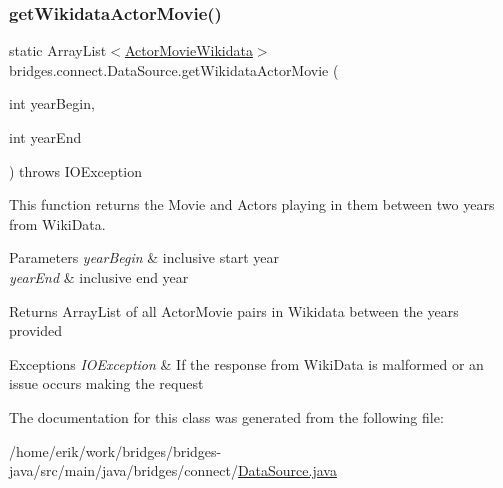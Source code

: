 \subsubsection{\texorpdfstring{get\+Wikidata\+Actor\+Movie()}{getWikidataActorMovie()}}
{\footnotesize\ttfamily static Array\+List$<$\hyperlink{classbridges_1_1data__src__dependent_1_1_actor_movie_wikidata}{Actor\+Movie\+Wikidata}$>$ bridges.\+connect.\+Data\+Source.\+get\+Wikidata\+Actor\+Movie (\begin{DoxyParamCaption}\item[{int}]{year\+Begin,  }\item[{int}]{year\+End }\end{DoxyParamCaption}) throws I\+O\+Exception\hspace{0.3cm}{\ttfamily [static]}}



This function returns the Movie and Actors playing in them between two years from Wiki\+Data. 


\begin{DoxyParams}{Parameters}
{\em year\+Begin} & inclusive start year \\
\hline
{\em year\+End} & inclusive end year \\
\hline
\end{DoxyParams}
\begin{DoxyReturn}{Returns}
Array\+List of all Actor\+Movie pairs in Wikidata between the years provided 
\end{DoxyReturn}

\begin{DoxyExceptions}{Exceptions}
{\em I\+O\+Exception} & If the response from Wiki\+Data is malformed or an issue occurs making the request \\
\hline
\end{DoxyExceptions}


The documentation for this class was generated from the following file\+:\begin{DoxyCompactItemize}
\item 
/home/erik/work/bridges/bridges-\/java/src/main/java/bridges/connect/\hyperlink{connect_2_data_source_8java}{Data\+Source.\+java}\end{DoxyCompactItemize}
